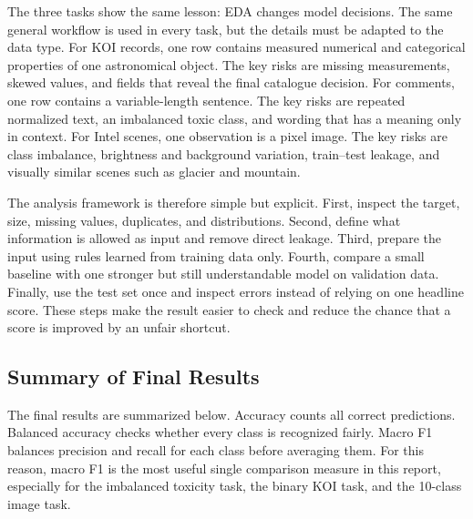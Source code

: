\documentclass[oneside]{hcmut-report}
\begin{document}
The three tasks show the same lesson: EDA changes model decisions. The same general workflow is used in every task, but the details must be adapted to the data type. For KOI records, one row contains measured numerical and categorical properties of one astronomical object. The key risks are missing measurements, skewed values, and fields that reveal the final catalogue decision. For comments, one row contains a variable-length sentence. The key risks are repeated normalized text, an imbalanced toxic class, and wording that has a meaning only in context. For Intel scenes, one observation is a pixel image. The key risks are class imbalance, brightness and background variation, train--test leakage, and visually similar scenes such as glacier and mountain.

The analysis framework is therefore simple but explicit. First, inspect the target, size, missing values, duplicates, and distributions. Second, define what information is allowed as input and remove direct leakage. Third, prepare the input using rules learned from training data only. Fourth, compare a small baseline with one stronger but still understandable model on validation data. Finally, use the test set once and inspect errors instead of relying on one headline score. These steps make the result easier to check and reduce the chance that a score is improved by an unfair shortcut.

\subsection{Summary of Final Results}

The final results are summarized below. Accuracy counts all correct predictions. Balanced accuracy checks whether every class is recognized fairly. Macro F1 balances precision and recall for each class before averaging them. For this reason, macro F1 is the most useful single comparison measure in this report, especially for the imbalanced toxicity task, the binary KOI task, and the 10-class image task.

\begin{table}[H]
\centering
\caption{Final selected-model results.}
\label{tab:final-results}
\end{table}
\end{document}
